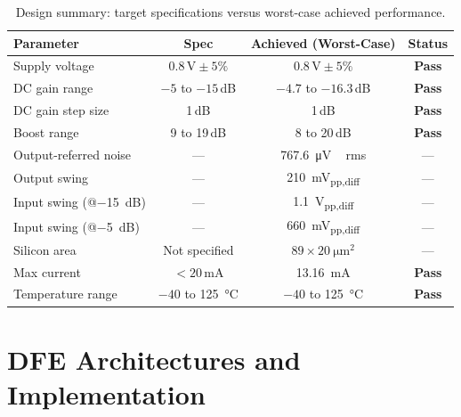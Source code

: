 \begin{table}[htbp]
    \centering
    \caption{Design summary: target specifications versus worst-case achieved performance.}
    \label{tab:summary}
    \begin{tabular}{lccc}
        \toprule
        \textbf{Parameter}         & \textbf{Spec}           & \textbf{Achieved (Worst-Case)} & \textbf{Status}         \\
        \midrule
        Supply voltage             & $0.8\,\text{V} \pm 5\%$ & $0.8\,\text{V} \pm 5\%$   & \textcolor{green!60!black}{\textbf{Pass}} \\
        DC gain range              & $-5$ to $-15$\,dB       & $-4.7$ to $-16.3$\,dB           & \textcolor{green!60!black}{\textbf{Pass}} \\
        DC gain step size          & 1\,dB                   & 1\,dB                      & \textcolor{green!60!black}{\textbf{Pass}} \\
        Boost range                & 9 to 19\,dB             & 8 to 20\,dB               & \textcolor{green!60!black}{\textbf{Pass}} \\
        Output-referred noise      & ---                     & \SI{767.6}{\micro\volt\,rms} & --- \\
        Output swing               & ---                     & \SI{210}{mV_{pp,diff}}       & --- \\
        Input swing (@\SI{-15}{dB})& ---                     & \SI{1.1}{V_{pp,diff}}        & --- \\
        Input swing (@\SI{-5}{dB}) & ---                     & \SI{660}{mV_{pp,diff}}       & --- \\
        Silicon area               & Not specified           & $89\times\SI{20}{\micro\metre\squared}$ & --- \\
        Max current                & $<20$\,mA               & \SI{13.16}{mA}             & \textcolor{green!60!black}{\textbf{Pass}} \\
        Temperature range          & $-40$ to \SI{125}{\celsius} & $-40$ to \SI{125}{\celsius} & \textcolor{green!60!black}{\textbf{Pass}} \\
        \bottomrule
    \end{tabular}
\end{table}

\section{DFE Architectures and Implementation}

 

